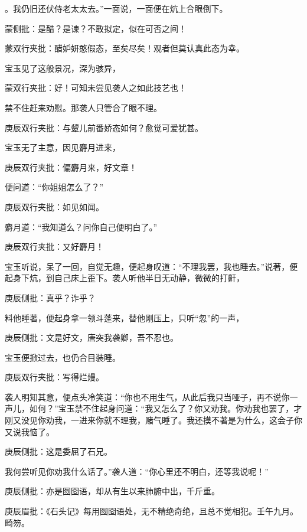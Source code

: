 \begin{parag}
。我仍旧还伏侍老太太去。”一面说，一面便在炕上合眼倒下。\begin{note}蒙侧批：是醋？是谏？不敢拟定，似在可否之间！\end{note}\begin{note}蒙双行夹批：醋妒妍憨假态，至矣尽矣！观者但莫认真此态为幸。\end{note}宝玉见了这般景况，深为骇异，\begin{note}蒙双行夹批：好！可知未尝见袭人之如此技艺也！\end{note}禁不住赶来劝慰。那袭人只管合了眼不理。\begin{note}庚辰双行夹批：与颦儿前番娇态如何？愈觉可爱犹甚。\end{note}宝玉无了主意，因见麝月进来，\begin{note}庚辰双行夹批：偏麝月来，好文章！\end{note}便问道：“你姐姐怎么了？”\begin{note}庚辰双行夹批：如见如闻。\end{note}麝月道：“我知道么？问你自己便明白了。”\begin{note}庚辰双行夹批：又好麝月！\end{note}宝玉听说，呆了一回，自觉无趣，便起身叹道：“不理我罢，我也睡去。”说著，便起身下炕，到自己床上歪下。袭人听他半日无动静，微微的打鼾，\begin{note}庚辰侧批：真乎？诈乎？\end{note}料他睡著，便起身拿一领斗蓬来，替他刚压上，只听“忽”的一声，\begin{note}庚辰侧批：文是好文，唐突我袭卿，吾不忍也。\end{note}宝玉便掀过去，也仍合目装睡。\begin{note}庚辰双行夹批：写得烂熳。\end{note}袭人明知其意，便点头冷笑道：“你也不用生气，从此后我只当哑子，再不说你一声儿，如何？”宝玉禁不住起身问道：“我又怎么了？你又劝我。你劝我也罢了，才刚又没见你劝我，一进来你就不理我，赌气睡了。我还摸不著是为什么，这会子你又说我恼了。\begin{note}庚辰侧批：这是委屈了石兄。\end{note}我何尝听见你劝我什么话了。”袭人道：“你心里还不明白，还等我说呢！”\begin{note}庚辰侧批：亦是囫囵语，却从有生以来肺腑中出，千斤重。\end{note}\begin{note}庚辰眉批：《石头记》每用囫囵语处，无不精绝奇绝，且总不觉相犯。壬午九月。畸笏。\end{note}
\end{parag}


